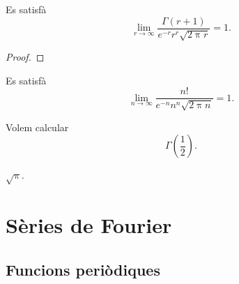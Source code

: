 \documentclass[../../main.tex]{subfiles}
\begin{document}
    \begin{theorem}
        \label{thm:fórmula d'Stirling}
        Es satisfà
        \[
            \lim_{r\to\infty}\frac{\Gamma(r+1)}{e^{-r}r^{r}\sqrt{2\uppi r}}=1.
        \]
        \begin{proof}
        \end{proof}
    \end{theorem}
    \begin{corollary}
        \label{cor:fórmula d'Stirling}
        Es satisfà
        \[
            \lim_{n\to\infty}\frac{n!}{e^{-n}n^{n}\sqrt{2\uppi n}}=1.
        \]
    \end{corollary}
    \begin{example}
        Volem calcular
        \[
            \Gamma\left(\frac{1}{2}\right).
        \]
        \begin{solution}
            \(\sqrt{\uppi}\).
        \end{solution}
    \end{example}
\chapter{Sèries de Fourier}
\section{Funcions periòdiques}
\end{document}
